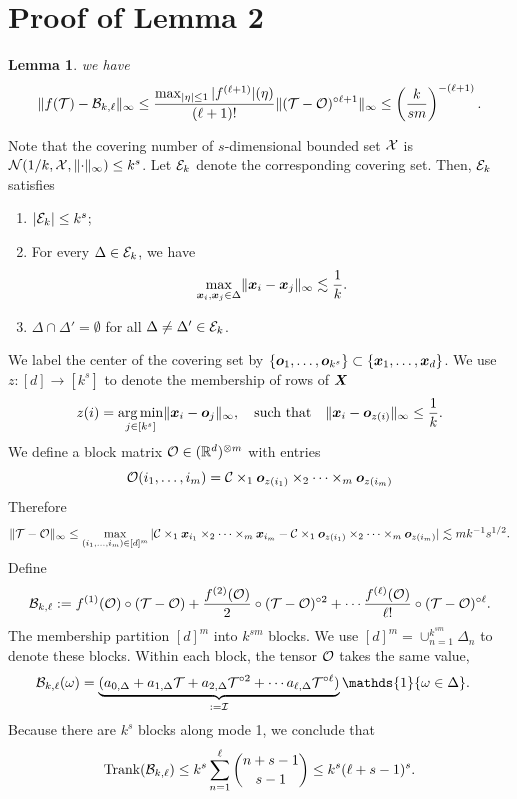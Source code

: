 \documentclass[final,12pt]{colt2020} %
\newtheorem{lem}{Lemma}
\newcommand*{\KeepStyleUnderBrace}[1]{%
  \mathop{%
    \mathchoice
    {\underbrace{\displaystyle#1}}%
    {\underbrace{\textstyle#1}}%
    {\underbrace{\scriptstyle#1}}%
    {\underbrace{\scriptscriptstyle#1}}%
  }\limits
}
\def\rank{\textup{Trank}}
\def\Mat{\textup{Mat}}
\begin{document}
\section{Proof of Lemma 2}
\begin{lem} we have
\[
\lVert f(\mathcal{T})-\mathcal{B}_{k,\ell}\rVert_\infty\leq {\max_{|\eta|\leq 1}|f^{(\ell+1)}|(\eta)\over (\ell+1)!}\lVert(\mathcal{T}-\mathcal{O})^{\circ {\ell+1}}\rVert_\infty\leq \left({k\over sm}\right)^{-(\ell+1)}. 
\]
\end{lem}
Note that the covering number of $s$-dimensional bounded set $\mathcal{X}$ is $\mathcal{N}(1/k, \mathcal{X}, \lVert\cdot\rVert_\infty)\leq k^s$. Let $\mathcal{E}_k$ denote the corresponding covering set. Then,  $\mathcal{E}_k$ satisfies 
\begin{enumerate} 
\item $|\mathcal{E}_k| \leq k^s$;
\item For every $\Delta \in\mathcal{E}_k$, we have
\[
 \max_{\bm x_i,\bm x_j\in \Delta}\lVert\bm x_i-\bm x_j\rVert_\infty\lesssim {1\over k}.
\]
\item $\Delta \cap \Delta'=\emptyset$ for all $\Delta\neq \Delta'\in\mathcal{E}_k$.
\end{enumerate}
We label the center of the covering set by $\{\bm{o}_1,\ldots,\bm{o}_{k^s}\} \subset\{\bm x_1,\ldots,\bm x_d\}$. We use $z\colon [d]\to[k^s]$ to denote the membership of rows of $\bm X$
\[
z(i)=\operatorname*{arg\,min}_{j\in[k^s]}\lVert\bm x_i - \bm{o}_j\rVert_\infty, \quad\text{such that}\quad \lVert\bm x_i-\bm{o}_{z(i)}\rVert_\infty\leq {1\over k}.
\]
We define a block matrix $\mathcal{O}\in(\mathbb{R}^{d})^{\otimes m}$ with entries
\[
\mathcal{O}(i_1,\ldots,i_m)=\mathcal{C}\times_1\bm{o}_{z(i_1)}\times_2\cdots\times_m \bm{o}_{z(i_m)} 
\]
Therefore
\[
\lVert\mathcal{T}-\mathcal{O}\rVert_\infty\leq \max_{(i_1,\ldots,i_m)\in[d]^m} |\mathcal{C}\times_1 \bm x_{i_1}\times_2\cdots \times_m \bm x_{i_m}-\mathcal{C}\times_1 \bm{o}_{z(i_1)}\times_2\cdots \times_m \bm{o}_{z(i_m)}|\lesssim mk^{-1}s^{1/2}.
\]
Define 
\[
\mathcal{B}_{k,\ell}:=f^{(1)}(\mathcal{O})\circ (\mathcal{T}-\mathcal{O})+{f^{(2)}(\mathcal{O})\over 2}\circ (\mathcal{T}-\mathcal{O})^{\circ 2}+\cdots {f^{(\ell)}(\mathcal{O})\over \ell!} \circ (\mathcal{T}-\mathcal{O})^{\circ \ell}.
\]
The membership partition $[d]^m$ into $k^{sm}$ blocks. We use $[d]^m=\cup_{n=1}^{k^{sm}}\Delta_n$ to denote these blocks. Within each block, the tensor $\mathcal{O}$ takes the same value, 
\begin{align}
\tB_{k,\ell}(\omega)&=\KeepStyleUnderBrace{(a_{0,\Delta}+a_{1,\Delta}\tT+a_{2,\Delta}\tT^{\circ 2}+\cdots a_{\ell,\Delta} \tT^{\circ \ell})}_{:=\tI}\mathds{1}\{\omega\in \Delta \}.
\end{align}
Because there are $k^{s}$ blocks along mode 1, we conclude that
\[
\rank(\tB_{k,\ell})\leq k^{s} \sum_{n=1}^\ell{n+s-1 \choose s-1} \leq k^{s}(\ell+s-1)^s.
\]
\end{document}
